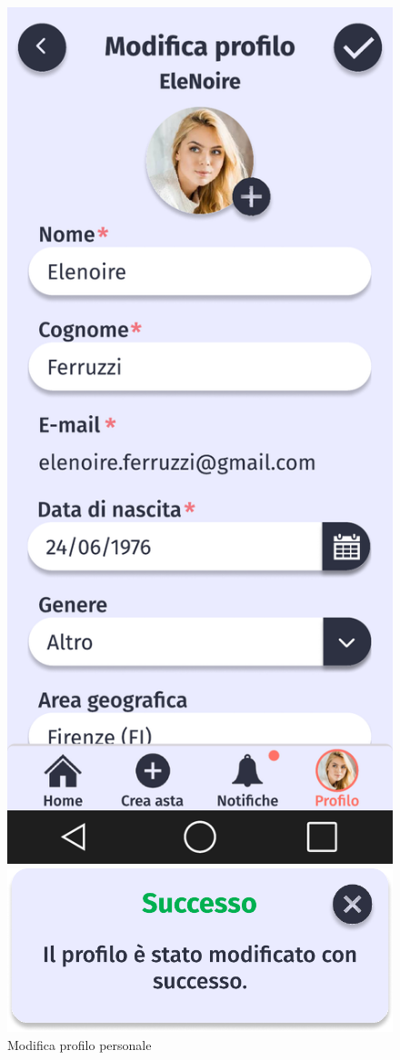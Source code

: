         \begin{figure}[!htb]
            \begin{minipage}{0.32\textwidth}
                    \centering
                    \includegraphics[width=.7\linewidth]{Immagini/Frames/Compratore/C12.pdf}
                    \caption{Modifica profilo personale}
            \end{minipage}\hfill
            \begin{minipage}{0.32\textwidth}
                    \centering
                    \includegraphics[width=.7\linewidth]{Immagini/Frames/Popup/P22.pdf}

\end{minipage}
\end{figure}
